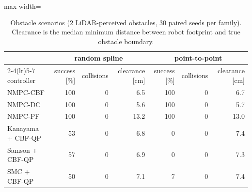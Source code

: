 \begin{table}[!htbp]
\centering\small
\caption{Obstacle scenarios (2 LiDAR-perceived obstacles, 30 paired seeds per family). Clearance is the median minimum distance between robot footprint and true obstacle boundary.}\label{tab:obstacles}
\begin{adjustbox}{max width=\linewidth}
\begin{tabular}{lrrrrrr}
\toprule
& \multicolumn{3}{c}{random spline} & \multicolumn{3}{c}{point-to-point} \\
\cmidrule(lr){2-4}\cmidrule(lr){5-7}
controller & success [\%] & collisions & clearance [cm] & success [\%] & collisions & clearance [cm] \\
\midrule
NMPC-CBF & 100 & 0 & 6.5 & 100 & 0 & 6.7 \\
NMPC-DC & 100 & 0 & 5.6 & 100 & 0 & 5.7 \\
NMPC-PF & 100 & 0 & 13.2 & 100 & 0 & 13.0 \\
Kanayama + CBF-QP & 53 & 0 & 6.8 & 0 & 0 & 7.4 \\
Samson + CBF-QP & 57 & 0 & 6.9 & 0 & 0 & 7.3 \\
SMC + CBF-QP & 50 & 0 & 7.1 & 7 & 0 & 7.4 \\
\bottomrule
\end{tabular}
\end{adjustbox}
\end{table}

